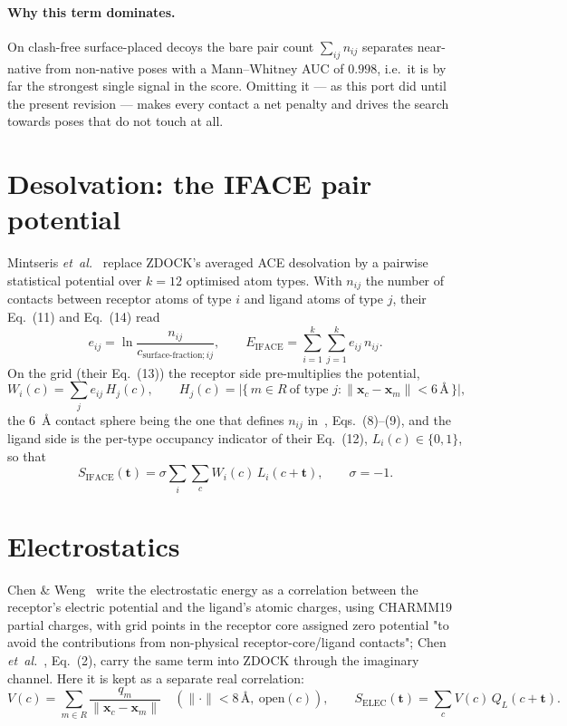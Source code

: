 \documentclass[11pt,a4paper]{article}
\newcommand{\Lgrid}{L}
\newcommand{\Siface}{S_{\mathrm{IFACE}}}
\newcommand{\Selec}{S_{\mathrm{ELEC}}}
\begin{document}
\paragraph{Why this term dominates.}
On clash-free surface-placed decoys the bare pair count
$\sum_{ij} n_{ij}$ separates near-native from non-native poses with a
Mann--Whitney AUC of $0.998$, i.e.\ it is by far the strongest single signal in
the score. Omitting it --- as this port did until the present revision --- makes
every contact a net penalty and drives the search towards poses that do not
touch at all.

\section{Desolvation: the IFACE pair potential}

Mintseris \emph{et~al.}~\cite{Mintseris2007} replace ZDOCK's averaged ACE
desolvation by a pairwise statistical potential over $k=12$ optimised atom
types. With $n_{ij}$ the number of contacts between receptor atoms of type $i$
and ligand atoms of type $j$, their Eq.~(11) and Eq.~(14) read
\begin{equation}
  e_{ij} = \ln \frac{n_{ij}}{c_{\text{surface-fraction};ij}},
  \qquad
  E_{\mathrm{IFACE}} = \sum_{i=1}^{k}\sum_{j=1}^{k} e_{ij}\, n_{ij}.
  \label{eq:iface}
\end{equation}
On the grid (their Eq.~(13)) the receptor side pre-multiplies the potential,
\begin{equation}
  W_i(c) = \sum_{j} e_{ij}\, H_j(c),
  \qquad
  H_j(c) = \bigl|\{\, m \in R \ \text{of type } j : \lVert \mathbf{x}_c-\mathbf{x}_m\rVert < 6\,\text{\AA} \,\}\bigr|,
\end{equation}
the 6~\AA{} contact sphere being the one that defines $n_{ij}$
in~\cite{Mintseris2007}, Eqs.~(8)--(9),
and the ligand side is the per-type occupancy indicator of their Eq.~(12),
$\Lgrid_i(c)\in\{0,1\}$, so that
\begin{equation}
  \Siface(\mathbf{t})
  = \sigma \sum_{i}\sum_{c} W_i(c)\,\Lgrid_i(c+\mathbf{t}),
  \qquad \sigma = -1 .
  \label{eq:iface-grid}
\end{equation}

\section{Electrostatics}

Chen \& Weng~\cite{ChenWeng2002} write the electrostatic energy as a
correlation between the receptor's electric potential and the ligand's atomic
charges, using CHARMM19 partial charges, with grid points in the receptor core
assigned zero potential "to avoid the contributions from non-physical
receptor-core/ligand contacts"; Chen \emph{et~al.}~\cite{Chen2003zdock},
Eq.~(2), carry the same term into ZDOCK through the imaginary channel. Here it
is kept as a separate real correlation:
\begin{equation}
  V(c) = \sum_{m \in R} \frac{q_m}{\lVert \mathbf{x}_c-\mathbf{x}_m\rVert}
  \quad (\lVert\cdot\rVert < 8\,\text{\AA},\ \mathrm{open}(c)),
  \qquad
  \Selec(\mathbf{t}) = \sum_c V(c)\, Q_L(c+\mathbf{t}).
\end{equation}
\end{document}

